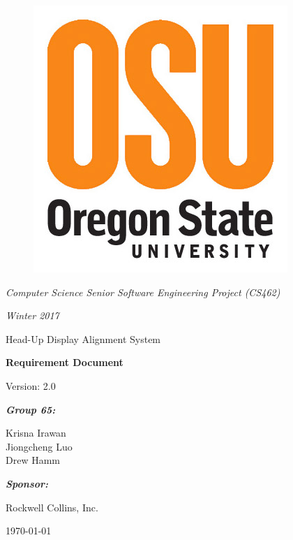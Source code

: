 \documentclass[letterpaper,10pt,onecolumn]{IEEEtran}
\def\title{Computer Science Senior Software Engineering Project (CS462)}
\def\name{Krisna Irawan\\ Jiongcheng Luo\\ Drew Hamm}
\def\doc{Requirement Document}
\def\version{2.0}
\def\term{Winter 2017}
\def\project{Head-Up Display Alignment System}
\begin{document}
\begin{titlepage}
\centering
	\begin{figure}
	      	\includegraphics[scale=0.25]{osu_logo}
	\end{figure}
	{\Large\itshape \title\par}
	{\Large\itshape \term\par}
	\vspace{1cm}
	\scshape{
		{\Huge \project\par}
		\vspace{1cm}
		{\Huge\bfseries\doc\par}
		{\large Version: \version\par}
	}
	\vspace{1cm}
	{\large\itshape\bfseries Group 65:\par}
	{\large \name\par}
	\vspace{1cm}
	{\large\itshape\bfseries Sponsor:\par}
	{\large Rockwell Collins, Inc.\par}
	\vspace{2cm}
	{\large \today\par}
	\vspace{4cm}

	\begin{abstract}
	We are working with Rockwell Collins to explore potential technological innovations relating to their Head-Up Display (HUD) systems that present critical flight information to pilots. Our primary objective is to improve Rockwell Collins current HUD systems by reducing the cost and time required to precisely align flight information to the HUD. To meet our objective we will look into using a new alignment methodology in conjunction with the current HUD system as a proof of concept. The product being developed is a demonstration system that looks to include a MEMS IRU mounted onto the HUD and a new alignment algorithm that utilizes this additional sensor to determine accurate HUD alignment. This document will introduce the specific details of the demonstration system and describe the requirements for the development of the product.
	\end{abstract}
\end{titlepage}
\tableofcontents
\end{document}
